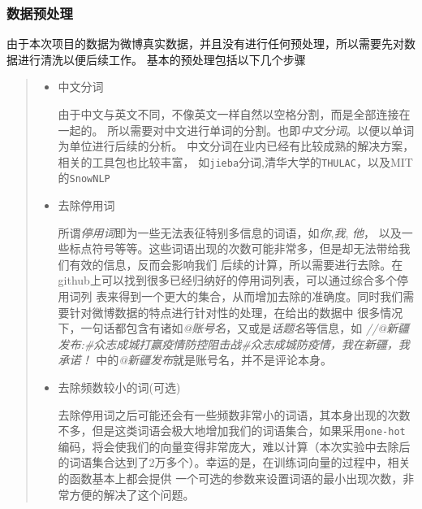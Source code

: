 \documentclass[UTF8]{ctexart}
\begin{document}
\subsubsection{数据预处理}
由于本次项目的数据为微博真实数据，并且没有进行任何预处理，所以需要先对数据进行清洗以便后续工作。
基本的预处理包括以下几个步骤
\begin{quote}
    \begin{itemize}
        \item 中文分词
        
        由于中文与英文不同，不像英文一样自然以空格分割，而是全部连接在一起的。
        所以需要对中文进行单词的分割。也即\textit{中文分词}。以便以单词为单位进行后续的分析。
        中文分词在业内已经有比较成熟的解决方案，相关的工具包也比较丰富，
        如\lstinline{jieba}分词,清华大学的\lstinline{THULAC}，以及MIT的\lstinline{SnowNLP}
        \item 去除停用词
        
        所谓\textit{停用词}即为一些无法表征特别多信息的词语，如\textit{你},\textit{我}, \textit{他}，
        以及一些标点符号等等。这些词语出现的次数可能非常多，但是却无法带给我们有效的信息，反而会影响我们
        后续的计算，所以需要进行去除。在github上可以找到很多已经归纳好的停用词列表，可以通过综合多个停用词列
        表来得到一个更大的集合，从而增加去除的准确度。同时我们需要针对微博数据的特点进行针对性的处理，在给出的数据中
        很多情况下，一句话都包含有诸如\textit{@账号名}，又或是\textit{话题名}等信息，如
        \textit{//@新疆发布:\#众志成城打赢疫情防控阻击战\#众志成城防疫情，我在新疆，我承诺！}
        中的\textit{@新疆发布}就是账号名，并不是评论本身。
        \item 去除频数较小的词(可选)
        
        去除停用词之后可能还会有一些频数非常小的词语，其本身出现的次数不多，但是这类词语会极大地增加我们的词语集合，如果采用\lstinline{one-hot}
        编码，将会使我们的向量变得非常庞大，难以计算（本次实验中去除后的词语集合达到了2万多个）。幸运的是，在训练词向量的过程中，相关的函数基本上都会提供
        一个可选的参数来设置词语的最小出现次数，非常方便的解决了这个问题。
    \end{itemize}
\end{quote}
\end{document}
